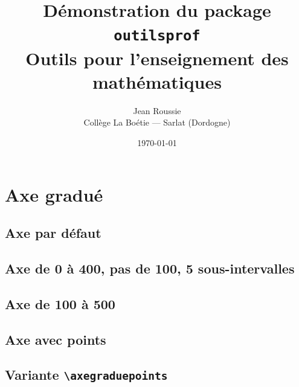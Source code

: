 \documentclass[11pt,a4paper]{article}
\title{\textbf{Démonstration du package \texttt{outilsprof}}\\
       \large Outils pour l'enseignement des mathématiques}
\author{Jean Roussie \\ \small Collège La Boétie — Sarlat (Dordogne)}
\date{\today}
\begin{document}
\maketitle

\tableofcontents
\newpage

\section{Axe gradué}

\subsection{Axe par défaut}

\begin{center}
\axegradue
\end{center}

\subsection{Axe de 0 à 400, pas de 100, 5 sous-intervalles}

\begin{center}
\axegradue[longueur=0.8, fin=400, pas=100, nombre=5]
\end{center}

\subsection{Axe de 100 à 500}

\begin{center}
\axegradue[debut=100, fin=500, pas=100, nombre=5]
\end{center}

\subsection{Axe avec points}

\begin{center}
\axegradue[fin=400, pas=100, nombre=5, points={A/120, B/340/blue, C/60/green}]
\end{center}

\subsection{Variante \texttt{\textbackslash axegraduepoints}}
\end{document}
